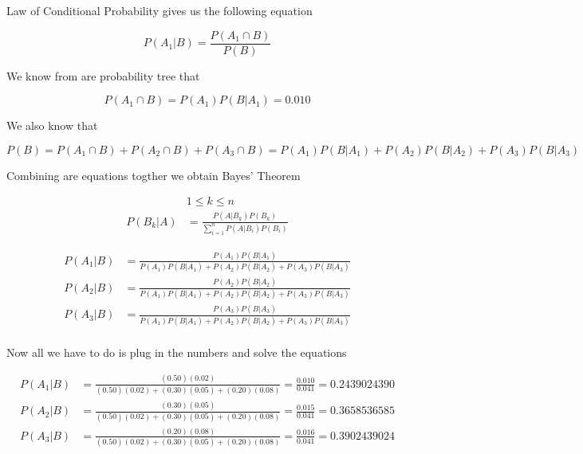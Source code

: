 \documentclass{report}
\begin{document}
\hspace{1cm}

Law of Conditional Probability gives us the following equation

\begin{equation} \label{eq3}
  P(A_1|B) = \frac{P(A_1\cap B)}{P(B)}
\end{equation}

We know from are probability tree that

\begin{equation} \label{eq3}
P(A_1\cap B)=P(A_1)P(B|A_1)=0.010
\end{equation}

We also know that

\begin{equation} \label{eq3}
  P(B) = P(A_1\cap B) + P(A_2\cap B) + P(A_3\cap B) = P(A_1)P(B|A_1) + P(A_2)P(B|A_2) + P(A_3)P(B|A_3)
\end{equation}

Combining are equations togther we obtain Bayes' Theorem

\begin{equation}
  \begin{split}
    & 1 \leq k \leq n \\
    P(B_k|A) & = \frac{P(A|B_k)P(B_k)}{\sum_{i=1}^{n}P(A|B_i)P(B_i)}
  \end{split}
\end{equation}

\begin{equation}
  \begin{split}
    P(A_1|B) & = \frac{P(A_1)P(B|A_1)}{P(A_1)P(B|A_1)+P(A_2)P(B|A_2)+P(A_3)P(B|A_3)} \\
    P(A_2|B) & = \frac{P(A_2)P(B|A_2)}{P(A_1)P(B|A_1)+P(A_2)P(B|A_2)+P(A_3)P(B|A_3)} \\
    P(A_3|B) & = \frac{P(A_3)P(B|A_3)}{P(A_1)P(B|A_1)+P(A_2)P(B|A_2)+P(A_3)P(B|A_3)} \\
  \end{split}
\end{equation}

\break

Now all we have to do is plug in the numbers and solve the equations

\begin{equation}
  \begin{split}
  P(A_1|B) & = \frac{(0.50)(0.02)}{(0.50)(0.02)+(0.30)(0.05) +(0.20)(0.08)} = \frac{0.010}{0.041} = 0.2439024390 \\
  P(A_2|B) & = \frac{(0.30)(0.05)}{(0.50)(0.02)+(0.30)(0.05) +(0.20)(0.08)} = \frac{0.015}{0.041} = 0.3658536585 \\
  P(A_3|B) & = \frac{(0.20)(0.08)}{(0.50)(0.02)+(0.30)(0.05) +(0.20)(0.08)} = \frac{0.016}{0.041} = 0.3902439024 \\
  \end{split}
\end{equation}
\end{document}

